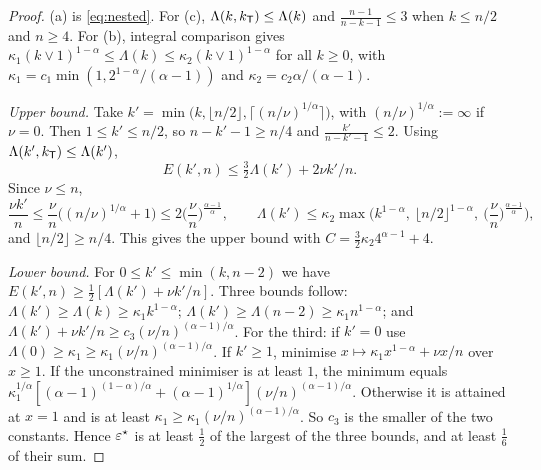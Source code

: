 \begin{proof}
(a) is \eqref{eq:nested}. For (c), $\Lambda(k,k_{\mathsf{T}})\le\Lambda(k)$ and $\frac{n-1}{n-k-1}\le3$ when $k\le n/2$ and $n\ge4$.
For (b), integral comparison gives $\kappa_1(k\vee1)^{1-\alpha}\le\Lambda(k)\le\kappa_2(k\vee1)^{1-\alpha}$ for all $k\ge0$, with
$\kappa_1=c_1\min(1,2^{1-\alpha}/(\alpha-1))$ and $\kappa_2=c_2\alpha/(\alpha-1)$.

\emph{Upper bound.} Take $k'=\min\big(k,\lfloor n/2\rfloor,\lceil(n/\nu)^{1/\alpha}\rceil\big)$, with $(n/\nu)^{1/\alpha}:=\infty$ if $\nu=0$. Then
$1\le k'\le n/2$, so $n-k'-1\ge n/4$ and $\frac{k'}{n-k'-1}\le2$. Using $\Lambda(k',k_{\mathsf{T}})\le\Lambda(k')$,
\[
E(k',n)\le\tfrac32\Lambda(k')+2\nu k'/n .
\]
Since $\nu\le n$,
\[
\frac{\nu k'}n\le\frac\nu n\big((n/\nu)^{1/\alpha}+1\big)\le2\Big(\frac\nu n\Big)^{\frac{\alpha-1}\alpha},\qquad
\Lambda(k')\le\kappa_2\max\Big(k^{1-\alpha},\ \lfloor n/2\rfloor^{1-\alpha},\ \Big(\frac\nu n\Big)^{\frac{\alpha-1}\alpha}\Big),
\]
and $\lfloor n/2\rfloor\ge n/4$. This gives the upper bound with $C=\frac32\kappa_2 4^{\alpha-1}+4$.

\emph{Lower bound.} For $0\le k'\le\min(k,n-2)$ we have $E(k',n)\ge\frac12[\Lambda(k')+\nu k'/n]$. Three bounds follow:
$\Lambda(k')\ge\Lambda(k)\ge\kappa_1k^{1-\alpha}$; $\Lambda(k')\ge\Lambda(n-2)\ge\kappa_1n^{1-\alpha}$; and
$\Lambda(k')+\nu k'/n\ge c_3(\nu/n)^{(\alpha-1)/\alpha}$. For the third: if $k'=0$ use $\Lambda(0)\ge\kappa_1\ge\kappa_1(\nu/n)^{(\alpha-1)/\alpha}$. If
$k'\ge1$, minimise $x\mapsto\kappa_1x^{1-\alpha}+\nu x/n$ over $x\ge1$. If the unconstrained minimiser is at least $1$, the
minimum equals $\kappa_1^{1/\alpha}[(\alpha-1)^{(1-\alpha)/\alpha}+(\alpha-1)^{1/\alpha}](\nu/n)^{(\alpha-1)/\alpha}$. Otherwise it is attained at $x=1$
and is at least $\kappa_1\ge\kappa_1(\nu/n)^{(\alpha-1)/\alpha}$. So $c_3$ is the smaller of the two constants. Hence $\varepsilon^\star$ is at least
$\frac12$ of the largest of the three bounds, and at least $\frac16$ of their sum.
\end{proof}

